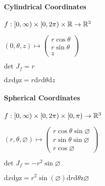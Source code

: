 \paragraph{Cylindrical Coordinates}
\begin{compactitem}
    \item $f: [0, \infty) \times [0, 2 \pi) \times \mathbb{R} \to \mathbb{R}^3$
    \item $(0, \theta, z) \mapsto 
        \begin{pmatrix}
            r \cos \theta\\
            r \sin \theta\\
            z
        \end{pmatrix}$
    \item $\text{det }J_f = r$
    \item $\mathrm{d}x\mathrm{d}y\mathrm{z} = r\mathrm{d}r\mathrm{d}\theta\mathrm{d}z$
\end{compactitem}

\paragraph{Spherical Coordinates}
\begin{compactitem}
    \item $f: [0, \infty) \times [0, 2 \pi) \times [0, \pi) \to \mathbb{R}^3$
    \item $(r, \theta, \varnothing) \mapsto
        \begin{pmatrix}
            r \cos \theta \sin \varnothing\\
            r \sin \theta \sin \varnothing\\
            r \cos \varnothing
        \end{pmatrix}$
    \item $\text{det } J_f = -r^2 \sin \varnothing$
    \item $\mathrm{d}x\mathrm{d}y\mathrm{z} = r^2 \sin(\varnothing)\mathrm{d}r\mathrm{d}\theta\mathrm{z}\varnothing$
\end{compactitem}

